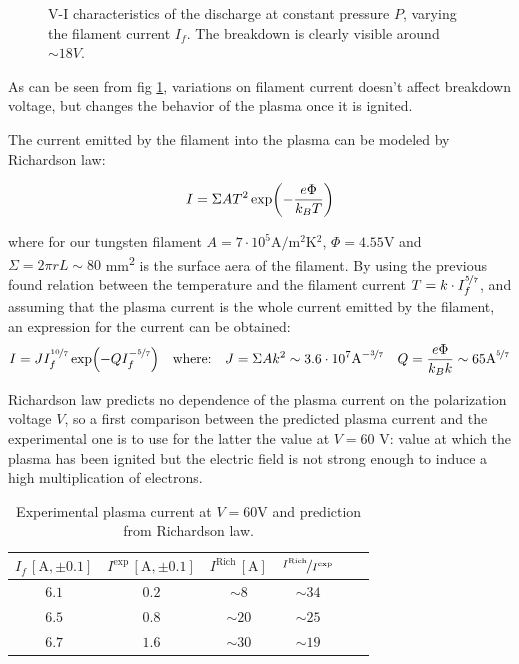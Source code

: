 \documentclass[11pt,a4 paper]{article}
\let\oldfrac\frac
\renewcommand{\frac}[3][d]{\ifthenelse{\equal{#1}{d}}{\oldfrac{#2}{#3}}{\nicefrac{#2}{#3}}}
\begin{document}
\begin{figure}[H]
  \centering
  \caption{V-I characteristics of the discharge at constant pressure $P$, varying the filament current $I_f$. The breakdown is clearly visible around $\sim18\si{V}$.}
  \label{fig:constP}
\end{figure}

As can be seen from fig \ref{fig:constP}, variations on filament current doesn't affect breakdown voltage, but changes the behavior of the plasma once it is ignited.

The current emitted by the filament into the plasma can be modeled by Richardson law:

\begin{equation*}
  I = \Sigma A T^2 \exp(-\frac{e\Phi}{k_BT})
\end{equation*}

where for our tungsten filament $A = 7\cdot 10^5 \si{\ampere/\metre^2\kelvin^2}$, $\Phi =  4.55 \si{\volt}$ and $\Sigma = 2\pi r L \sim 80$ \si{\milli\metre^2} is the surface aera of the filament. By using the previous found relation between the temperature and the filament current $T = k\cdot I_f^{\frac[f]{5}{7}}$, and assuming that the plasma current is the whole current emitted by the filament, an expression for the current can be obtained:
\begin{gather*}
  I = JI_f^{\frac[f]{10}{7}}\exp(-QI_f^{-\frac[f]{5}{7}}) \quad\text{where:}\quad
  J = \Sigma A k^2 \sim 3.6 \cdot 10^7 \text{A}^{-\frac[f]{3}{7}} \quad
  Q = \frac{e\Phi}{k_Bk} \sim 65 \text{A}^{\frac[f]{5}{7}}
\end{gather*}

Richardson law predicts no dependence of the plasma current on the polarization voltage $V$, so a first comparison between the predicted plasma current and the experimental one is to use for the latter the value at $V = 60$ \si{\volt}: value at which the plasma has been ignited but the electric field is not strong enough to induce a high multiplication of electrons.

\begin{table}[H]
  \centering
  \begin{tabular}{cccccc}
    \toprule
    $I_f\,[\si{\ampere},\pm0.1]$ & $I^{\text{exp}}\,[\si{\ampere},\pm0.1]$ & $I^{\text{Rich}}\,[\si{\ampere}]$  & $\frac[f]{I^{\text{Rich}}}{I^{\text{exp}}}$\\
    \midrule
    $6.1$ & $0.2$ & $\sim8$ & $\sim34$ \\
    $6.5$ & $0.8$ & $\sim20$ & $\sim25$ \\
    $6.7$ & $1.6$ & $\sim30$ & $\sim19$ \\
    \bottomrule
  \end{tabular}
  \caption{Experimental plasma current at $V = 60\si{\volt}$ and prediction from Richardson law.}
  \label{tab:richardson}
\end{table}
\end{document}
